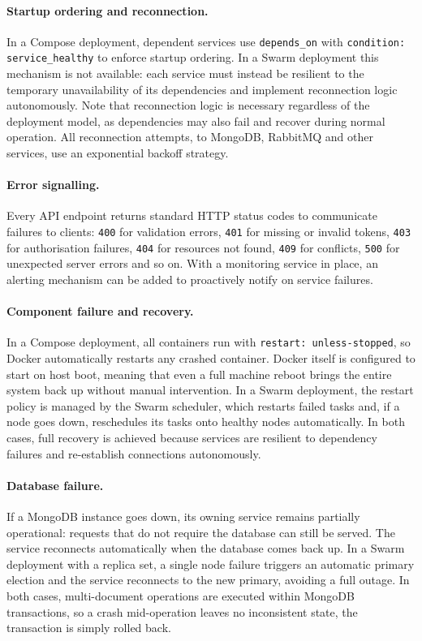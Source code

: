 \paragraph{Startup ordering and reconnection.}
In a Compose deployment, dependent services use \texttt{depends\_on} with \texttt{condition: service\_healthy} to enforce startup ordering. In a Swarm deployment this mechanism is not available: each service must instead be resilient to the temporary unavailability of its dependencies and implement reconnection logic autonomously. Note that reconnection logic is necessary regardless of the deployment model, as dependencies may also fail and recover during normal operation. All reconnection attempts, to MongoDB, RabbitMQ and other services, use an exponential backoff strategy.

\paragraph{Error signalling.}
Every API endpoint returns standard HTTP status codes to communicate failures to clients: \texttt{400} for validation errors, \texttt{401} for missing or invalid tokens, \texttt{403} for authorisation failures, \texttt{404} for resources not found, \texttt{409} for conflicts, \texttt{500} for unexpected server errors and so on. With a monitoring service in place, an alerting mechanism can be added to proactively notify on service failures.

\paragraph{Component failure and recovery.}
In a Compose deployment, all containers run with \texttt{restart: unless-stopped}, so Docker automatically restarts any crashed container. Docker itself is configured to start on host boot, meaning that even a full machine reboot brings the entire system back up without manual intervention. In a Swarm deployment, the restart policy is managed by the Swarm scheduler, which restarts failed tasks and, if a node goes down, reschedules its tasks onto healthy nodes automatically. In both cases, full recovery is achieved because services are resilient to dependency failures and re-establish connections autonomously.

\paragraph{Database failure.}
If a MongoDB instance goes down, its owning service remains partially operational: requests that do not require the database can still be served. The service reconnects automatically when the database comes back up. In a Swarm deployment with a replica set, a single node failure triggers an automatic primary election and the service reconnects to the new primary, avoiding a full outage. In both cases, multi-document operations are executed within MongoDB transactions, so a crash mid-operation leaves no inconsistent state, the transaction is simply rolled back.

